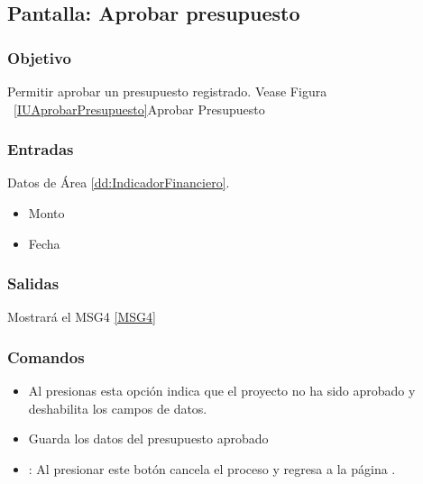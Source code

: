 \subsection{Pantalla: Aprobar presupuesto}

\subsubsection{Objetivo}
Permitir aprobar un presupuesto registrado.  Vease Figura ~\ref{IUAprobarPresupuesto}{Aprobar Presupuesto}



\subsubsection{Entradas}
Datos de Área \ref{dd:IndicadorFinanciero}.
\begin{itemize}
 \item Monto
 \item Fecha
\end{itemize}


\subsubsection{Salidas}
Mostrará el MSG4 \ref{MSG4}

\subsubsection{Comandos}
\begin{itemize}
 \item {} Al presionas esta opción indica que el proyecto no ha sido aprobado y deshabilita los campos de datos.
 \item {} Guarda los datos del presupuesto aprobado
 \item {}: Al presionar este botón cancela el proceso y regresa a la página .

\end{itemize}


